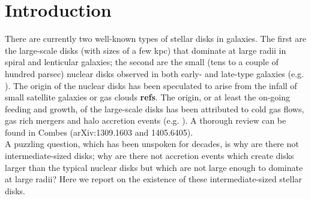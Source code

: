 \documentclass[12pt,preprint]{nature}
\begin{document}
\begin{abstract}





\end{abstract}



\section{Introduction}

There are currently two well-known types of stellar disks in galaxies. 
The first are the large-scale disks (with sizes of a few kpc)  
that dominate at large radii in spiral and lenticular galaxies; 
the second are the small (tens to a couple of hundred parsec) nuclear disks 
observed in both early- and late-type galaxies
(e.g. \citealt{scorzavandenbosch1998,rest2001,balcells2007,ledo2010}).
The origin of the nuclear disks has been speculated to arise 
from the infall of small satellite galaxies or gas clouds {\bf refs}.  
The origin, or at least the on-going feeding and growth, of the large-scale disks 
has been attributed to cold gas flows, gas rich mergers and halo accretion events 
(e.g. \citealt{khochfarsilk2006,dekel2009nat,dekel2009apj,ceverino2010,ceverino2012,conselice2012}).  
A thorough review can be found in Combes (arXiv:1309.1603 and 1405.6405). \\

A puzzling question, which has been unspoken for decades, 
is why are there not intermediate-sized disks; 
why are there not accretion events which create disks larger than the typical nuclear disks 
but which are not large enough to dominate at large radii? 
Here we report on the existence of these intermediate-sized stellar disks. \\
\end{document}
